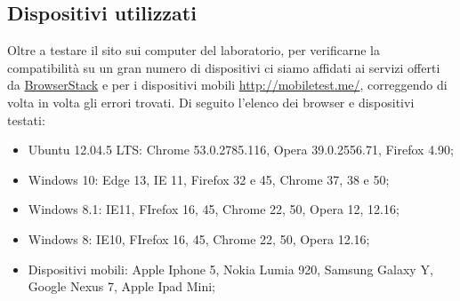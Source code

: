 {	\subsection{Dispositivi utilizzati}{
		Oltre a testare il sito sui computer del laboratorio, per verificarne la compatibilità su un gran numero di dispositivi ci siamo affidati ai servizi offerti da \href{https://www.browserstack.com/screenshots}{BrowserStack} e per i dispositivi mobili \url{http://mobiletest.me/}, correggendo di volta in volta gli errori trovati.  Di seguito l'elenco dei browser e dispositivi testati:
		\begin{itemize}\itemsep1pt
			\item Ubuntu 12.04.5 LTS: Chrome 53.0.2785.116, Opera 39.0.2556.71, Firefox 4.90;
			\item Windows 10: Edge 13, IE 11, Firefox 32 e 45, Chrome 37, 38 e 50;
			\item Windows 8.1: IE11, FIrefox 16, 45, Chrome 22, 50, Opera 12, 12.16;
			\item Windows 8: IE10, FIrefox 16, 45, Chrome 22, 50, Opera 12.16;
			\item Dispositivi mobili: Apple Iphone 5, Nokia Lumia 920, Samsung Galaxy Y, Google Nexus 7, Apple Ipad Mini;
		\end{itemize}
	}
}
